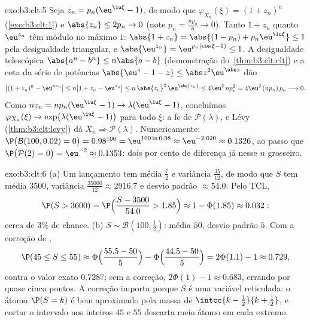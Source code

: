 \begin{solution}{exo:b3:clt:5}
Seja $z_n = p_n(\eu^{\iu\xi} - 1)$, de modo que $\varphi_{X_n}(\xi) =
(1 + z_n)^n$ (\cref{exo:b3:clt:1}) e $\abs{z_n} \leq 2p_n
\to 0$ (note $p_n = \frac{np_n}n \to 0$). Tanto $1 + z_n$ quanto
$\eu^{z_n}$ têm módulo no máximo $1$: $\abs{1 + z_n} =
\abs{(1 - p_n) + p_n\eu^{\iu\xi}} \leq 1$ pela desigualdade
triangular, e $\abs{\eu^{z_n}} = \eu^{p_n(\cos\xi - 1)}
\leq 1$. A desigualdade telescópica $\abs{a^n - b^n} \leq
n\abs{a - b}$ (demonstração do~\cref{thm:b3:clt:clt}) e a cota da série
de potências $\abs{\eu^z - 1 - z} \leq
\abs z^2\eu^{\abs z}$ dão
\[
\bigl|(1 + z_n)^n - \eu^{nz_n}\bigr| \leq n\bigl|1 + z_n -
\eu^{z_n}\bigr| \leq n\,\abs{z_n}^2\,\eu^{\abs{z_n}} \leq
4\eu^2\,np_n^2 = 4\eu^2\,(np_n)\,p_n \longrightarrow 0 .
\]
Como $nz_n = np_n(\eu^{\iu\xi} - 1) \to
\lambda(\eu^{\iu\xi} - 1)$, concluímos $\varphi_{X_n}(\xi)
\to \exp\bigl(\lambda(\eu^{\iu\xi} - 1)\bigr)$ para todo
$\xi$: a fc de $\mathcal P(\lambda)$, e Lévy
(\cref{thm:b3:clt:levy}) dá $X_n \Rightarrow \mathcal
P(\lambda)$. Numericamente: $\P\bigl(\mathcal B(100, 0.02) =
0\bigr) = 0.98^{100} = \eu^{100\ln 0.98} \approx
\eu^{-2.020} \approx 0.1326$, ao passo que $\P\bigl(\mathcal P(2) =
0\bigr) = \eu^{-2} \approx 0.1353$: dois por cento de diferença
já nesse $n$ grosseiro.
\end{solution}

\begin{solution}{exo:b3:clt:6}
(a) Um lançamento tem média $\frac72$ e variância
$\frac{35}{12}$, de modo que $S$ tem média $3500$, variância
$\frac{35000}{12} \approx 2916.7$ e desvio padrão
$\approx 54.0$. Pelo TCL,
\[
\P(S > 3600) = \P\Bigl(\frac{S - 3500}{54.0} > 1.85\Bigr)
\approx 1 - \Phi(1.85) \approx 0.032 :
\]
cerca de $3\%$ de chance.
(b) $S \sim \mathcal B(100, \frac12)$: média $50$, desvio
padrão $5$. Com a correção de ,
\[
\P(45 \leq S \leq 55) \approx
\Phi\Bigl(\frac{55.5 - 50}{5}\Bigr) -
\Phi\Bigl(\frac{44.5 - 50}{5}\Bigr) = 2\Phi(1.1) - 1
\approx 0.729,
\]
contra o valor exato $0.7287$; sem a correção,
$2\Phi(1) - 1 \approx 0.683$, errando por quase cinco pontos. A
correção importa porque $S$ é uma variável reticulada: o
átomo $\P(S = k)$ é bem aproximado pela massa 
de $\intcc{k - \frac12}{k + \frac12}$, e cortar o
intervalo nos inteiros $45$ e $55$ descarta meio átomo
em cada extremo.
\end{solution}

